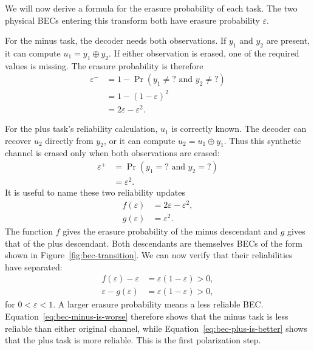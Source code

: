 We will now derive a formula for the erasure probability of each task. The two physical BECs entering this transform both have erasure probability $\varepsilon$.

For the minus task, the decoder needs both observations. If $y_1$ and $y_2$ are present, it can compute $u_1=y_1\oplus y_2$. If either observation is erased, one of the required values is missing. The erasure probability is therefore
\begin{subequations}
\label{eq:bec-minus-derivation}
\begin{align}
\varepsilon^-
&=1-\Pr(y_1\neq ?\text{ and }y_2\neq ?)
\label{eq:bec-minus-complement}\\
&=1-(1-\varepsilon)^2
\label{eq:bec-minus-independent}\\
&=2\varepsilon-\varepsilon^2.
\label{eq:bec-minus-result}
\end{align}
\end{subequations}

For the plus task's reliability calculation, $u_1$ is correctly known. The decoder can recover $u_2$ directly from $y_2$, or it can compute $u_2=u_1\oplus y_1$. Thus this synthetic channel is erased only when both observations are erased:
\begin{subequations}
\label{eq:bec-plus-derivation}
\begin{align}
\varepsilon^+
&=\Pr(y_1=?\text{ and }y_2=?)
\label{eq:bec-plus-intersection}\\
&=\varepsilon^2.
\label{eq:bec-plus-result}
\end{align}
\end{subequations}
It is useful to name these two reliability updates
\begin{align}
f(\varepsilon)&=2\varepsilon-\varepsilon^2,
\label{eq:bec-minus-recursion-function}\\
g(\varepsilon)&=\varepsilon^2.
\label{eq:bec-plus-recursion-function}
\end{align}
The function $f$ gives the erasure probability of the minus descendant and $g$ gives that of the plus descendant. Both descendants are themselves BECs of the form shown in Figure~\ref{fig:bec-transition}. We can now verify that their reliabilities have separated:
\begin{subequations}
\label{eq:bec-reliability-separation}
\begin{align}
f(\varepsilon)-\varepsilon&=\varepsilon(1-\varepsilon)>0,
\label{eq:bec-minus-is-worse}\\
\varepsilon-g(\varepsilon)&=\varepsilon(1-\varepsilon)>0,
\label{eq:bec-plus-is-better}
\end{align}
\end{subequations}
for $0<\varepsilon<1$. A larger erasure probability means a less reliable BEC. Equation~\eqref{eq:bec-minus-is-worse} therefore shows that the minus task is less reliable than either original channel, while Equation~\eqref{eq:bec-plus-is-better} shows that the plus task is more reliable. This is the first polarization step.

